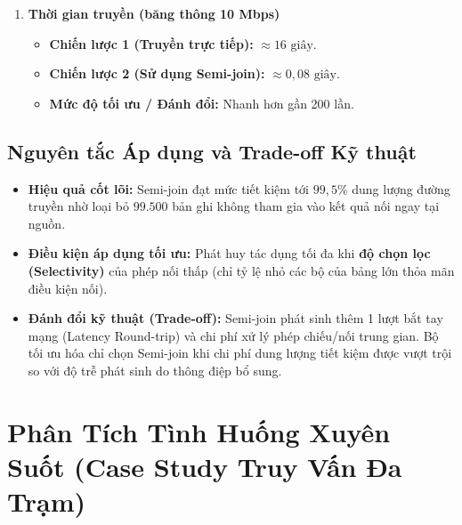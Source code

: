\documentclass[12pt,a4paper]{report}
\begin{document}
\begin{enumerate}[leftmargin=0.8cm, topsep=1pt, itemsep=2pt]
\begin{itemize}[label=$\circ$, leftmargin=0.8cm, topsep=1pt, itemsep=1pt]
        \item \textbf{Mức độ tối ưu / Đánh đổi:} Tiết kiệm \textbf{19.898 KB ($\approx 99,5\%$)}.
    \end{itemize}
    \item \textbf{Thời gian truyền (băng thông 10 Mbps)}
    \begin{itemize}[label=$\circ$, leftmargin=0.8cm, topsep=1pt, itemsep=1pt]
        \item \textbf{Chiến lược 1 (Truyền trực tiếp):} $\approx 16\text{ giây}$.
        \item \textbf{Chiến lược 2 (Sử dụng Semi-join):} $\approx 0,08\text{ giây}$.
        \item \textbf{Mức độ tối ưu / Đánh đổi:} Nhanh hơn gần 200 lần.
    \end{itemize}
\end{enumerate}

\subsection{Nguyên tắc Áp dụng và Trade-off Kỹ thuật}
\begin{itemize}[leftmargin=0.8cm, topsep=1pt, itemsep=1pt]
    \item \textbf{Hiệu quả cốt lõi:} Semi-join đạt mức tiết kiệm tới $99,5\%$ dung lượng đường truyền nhờ loại bỏ $99.500$ bản ghi không tham gia vào kết quả nối ngay tại nguồn.
    \item \textbf{Điều kiện áp dụng tối ưu:} Phát huy tác dụng tối đa khi \textbf{độ chọn lọc (Selectivity)} của phép nối thấp (chỉ tỷ lệ nhỏ các bộ của bảng lớn thỏa mãn điều kiện nối).
    \item \textbf{Đánh đổi kỹ thuật (Trade-off):} Semi-join phát sinh thêm 1 lượt bắt tay mạng (Latency Round-trip) và chi phí xử lý phép chiếu/nối trung gian. Bộ tối ưu hóa chỉ chọn Semi-join khi chi phí dung lượng tiết kiệm được vượt trội so với độ trễ phát sinh do thông điệp bổ sung.
\end{itemize}

\section{Phân Tích Tình Huống Xuyên Suốt (Case Study Truy Vấn Đa Trạm)}
\end{document}
